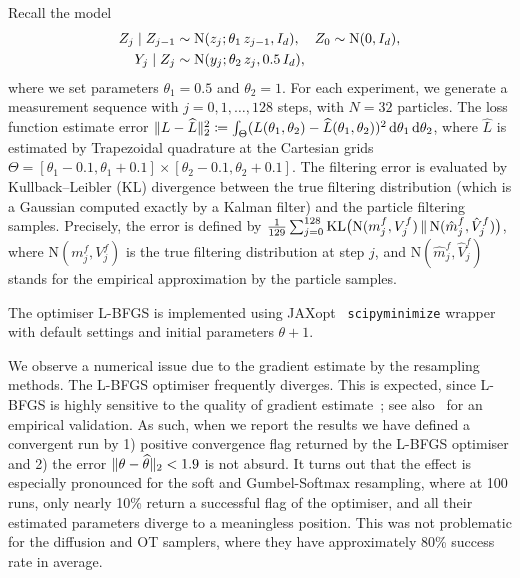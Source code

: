 \documentclass{article}
\begin{document}
Recall the model
%
\begin{equation}
    \begin{split}
        Z_j {\;|\;} Z_{j-1} &\sim \mathrm{N}(z_j ; \theta_1 \, z_{j-1}, I_d), \quad Z_0 \sim \mathrm{N}(0, I_d), \\
        Y_j {\;|\;} Z_j &\sim \mathrm{N}(y_j ; \theta_2 \, z_j, 0.5 \, I_d),
    \end{split}
\end{equation}
%
where we set parameters $\theta_1=0.5$ and $\theta_2=1$. 
For each experiment, we generate a measurement sequence with $j=0,1,\ldots, 128$ steps, with $N=32$ particles. 
The loss function estimate error $\lVert L - \widehat{L}\rVert^2_2 \coloneqq \int_\Theta (L(\theta_1, \theta_2) - \widehat{L}(\theta_1, \theta_2))^2 \mathop{}\!\mathrm{d} \theta_1\mathop{}\!\mathrm{d}\theta_2$, where $\widehat{L}$ is estimated by Trapezoidal quadrature at the Cartesian grids $\Theta = [\theta_1 - 0.1, \theta_1 + 0.1]\times [\theta_2 - 0.1, \theta_2 + 0.1]$. 
The filtering error is evaluated by Kullback--Leibler (KL) divergence between the true filtering distribution (which is a Gaussian computed exactly by a Kalman filter) and the particle filtering samples. 
Precisely, the error is defined by $\frac{1}{129}\sum_{j=0}^{128}\mathrm{KL}\bigl( \mathrm{N}(m_j^f, V^f_j) \, \Vert \, \mathrm{N}(\hat{m}_j^f, \hat{V}^f_j) \bigr)$, where $\mathrm{N}(m_j^f, V^f_j)$ is the true filtering distribution at step $j$, and $\mathrm{N}(\hat{m}_j^f, \hat{V}^f_j)$ stands for the empirical approximation by the particle samples. 

The optimiser L-BFGS is implemented using JAXopt~\citep{Blondel2021} \texttt{scipyminimize} wrapper with default settings and initial parameters $\theta + 1$. 

We observe a numerical issue due to the gradient estimate by the resampling methods. 
The L-BFGS optimiser frequently diverges. 
This is expected, since L-BFGS is highly sensitive to the quality of gradient estimate~\citep{Xie2020}; see also~\citet{Zhao2023MFS} for an empirical validation. 
As such, when we report the results we have defined a convergent run by 1) positive convergence flag returned by the L-BFGS optimiser and 2) the error $\lVert\theta - \widehat{\theta}\rVert_2 < 1.9 $ is not absurd. 
It turns out that the effect is especially pronounced for the soft and Gumbel-Softmax resampling, where at 100 runs, only nearly 10\% return a successful flag of the optimiser, and all their estimated parameters diverge to a meaningless position. 
This was not problematic for the diffusion and OT samplers, where they have approximately 80\% success rate in average. 
\end{document}
